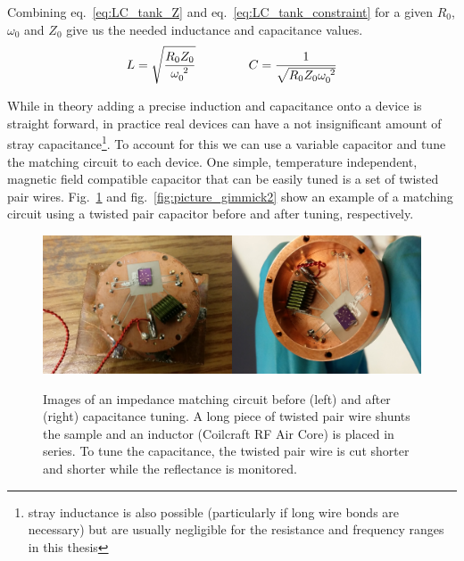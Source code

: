 Combining eq.~\ref{eq:LC_tank_Z} and eq.~\ref{eq:LC_tank_constraint} for a given $R_0$, $\omega_0$ and $Z_0$ give us the needed inductance and capacitance values.
\begin{equation}\label{eq:LC_tank_LC}
L = \sqrt{\frac{R_0Z_0}{\omega_0^{~2}}}
\hspace{15mm}
C = \frac{1}{\sqrt{R_0Z_0\omega_0^{~2}}}
\end{equation}

While in theory adding a precise induction and capacitance onto a device is straight forward, in practice real devices can have a not insignificant amount of stray capacitance\footnote{stray inductance is also possible (particularly if long wire bonds are necessary) but are usually negligible for the resistance and frequency ranges in this thesis}. To account for this we can use a variable capacitor and tune the matching circuit to each device. One simple, temperature independent, magnetic field compatible capacitor that can be easily tuned is a set of twisted pair wires. Fig.~\ref{fig:picture_gimmick1} and fig.~\ref{fig:picture_gimmick2} show an example of a matching circuit using a twisted pair capacitor before and after tuning, respectively.
\begin{figure}
\centering
\includegraphics[width=0.5\textwidth]{figures/Johnson_noise_thermometry/picture_gimmick1.jpg}\includegraphics[width=0.5\textwidth]{figures/Johnson_noise_thermometry/picture_gimmick2.jpg}
\caption{Images of an impedance matching circuit before (left) and after (right) capacitance tuning. A long piece of twisted pair wire shunts the sample and an inductor (Coilcraft RF Air Core) is placed in series. To tune the capacitance, the twisted pair wire is cut shorter and shorter while the reflectance is monitored.}
\label{fig:picture_gimmick1}
\end{figure} 

